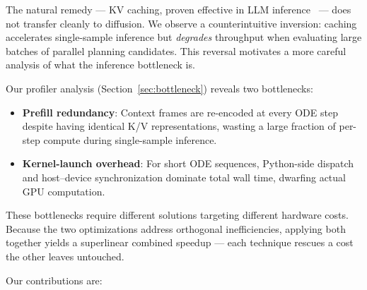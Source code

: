 \documentclass[letterpaper,twocolumn,10pt]{article}
\begin{document}
The natural remedy --- KV caching, proven effective in LLM
inference~\cite{openai2019gpt3} --- does not transfer cleanly to
diffusion.  We observe a counterintuitive inversion: caching accelerates
single-sample inference but \emph{degrades} throughput when evaluating
large batches of parallel planning candidates.  This reversal motivates a
more careful analysis of what the inference bottleneck is. 

Our profiler analysis (Section~\ref{sec:bottleneck}) reveals two bottlenecks:
\begin{itemize}
  \item \textbf{Prefill redundancy}: Context frames are re-encoded at every ODE step
        despite having identical K/V representations, wasting a large fraction
        of per-step compute during single-sample inference.
  \item \textbf{Kernel-launch overhead}: For short ODE sequences, Python-side dispatch
        and host--device synchronization dominate total wall time, dwarfing
        actual GPU computation.
\end{itemize}

These bottlenecks require different solutions targeting different hardware
costs.  Because the two optimizations address orthogonal inefficiencies,
applying both together yields a superlinear combined speedup --- each technique
rescues a cost the other leaves untouched.

Our contributions are:
\end{document}
